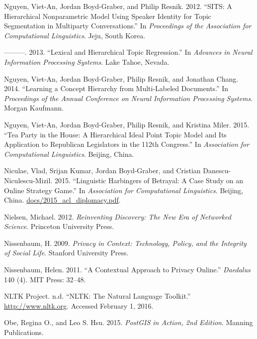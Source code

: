 \documentclass[]{krantz}
\begin{document}
\hypertarget{ref-nguyen-12}{}
Nguyen, Viet-An, Jordan Boyd-Graber, and Philip Resnik. 2012. ``SITS: A
Hierarchical Nonparametric Model Using Speaker Identity for Topic
Segmentation in Multiparty Conversations.'' In \emph{Proceedings of the
Association for Computational Linguistics}. Jeju, South Korea.

\hypertarget{ref-nguyen-13:shlda}{}
---------. 2013. ``Lexical and Hierarchical Topic Regression.'' In
\emph{Advances in Neural Information Processing Systems}. Lake Tahoe,
Nevada.

\hypertarget{ref-Nguyen:Boyd-Graber:Resnik:Chang-2014}{}
Nguyen, Viet-An, Jordan Boyd-Graber, Philip Resnik, and Jonathan Chang.
2014. ``Learning a Concept Hierarchy from Multi-Labeled Documents.'' In
\emph{Proceedings of the Annual Conference on Neural Information
Processing Systems}. Morgan Kaufmann.

\hypertarget{ref-Nguyen:Boyd-Graber:Resnik:Miler-2015}{}
Nguyen, Viet-An, Jordan Boyd-Graber, Philip Resnik, and Kristina Miler.
2015. ``Tea Party in the House: A Hierarchical Ideal Point Topic Model
and Its Application to Republican Legislators in the 112th Congress.''
In \emph{Association for Computational Linguistics}. Beijing, China.

\hypertarget{ref-niculae-15}{}
Niculae, Vlad, Srijan Kumar, Jordan Boyd-Graber, and Cristian
Danescu-Niculescu-Mizil. 2015. ``Linguistic Harbingers of Betrayal: A
Case Study on an Online Strategy Game.'' In \emph{Association for
Computational Linguistics}. Beijing, China.
\url{docs/2015_acl_diplomacy.pdf}.

\hypertarget{ref-nielsen2012reinventing}{}
Nielsen, Michael. 2012. \emph{Reinventing Discovery: The New Era of
Networked Science}. Princeton University Press.

\hypertarget{ref-nissenbaum2009}{}
Nissenbaum, H. 2009. \emph{Privacy in Context: Technology, Policy, and
the Integrity of Social Life}. Stanford University Press.

\hypertarget{ref-nissenbaum2011contextual}{}
Nissenbaum, Helen. 2011. ``A Contextual Approach to Privacy Online.''
\emph{Daedalus} 140 (4). MIT Press: 32--48.

\hypertarget{ref-NLTKweb}{}
NLTK Project. n.d. ``NLTK: The Natural Language Toolkit.''
\url{http://www.nltk.org}. Accessed February 1, 2016.

\hypertarget{ref-PostGISInAction}{}
Obe, Regina O., and Leo S. Hsu. 2015. \emph{PostGIS in Action, 2nd
Edition}. Manning Publications.
\end{document}
